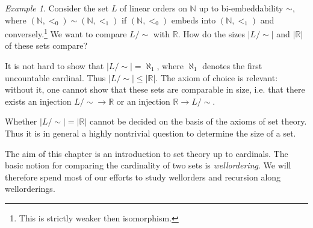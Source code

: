 \documentclass[a4paper, 11pt]{amsart}
\theoremstyle{remark}
\newtheorem{example}[example]{Example}
\newcommand{\NN}{\mathbb{N}}
\newcommand{\RR}{\mathbb{R}}
\begin{document}

\begin{example} 
Consider the set $L$ of linear orders on $\NN$ up to bi-embeddability $\sim$, where $(\NN,<_0)\sim (\NN,<_1)$ if $(\NN,<_0)$ embeds into $(\NN,<_1)$ and conversely.\footnote{This is strictly weaker then isomorphism.} 
We want to compare $L{/}{\sim}$ with $\RR$. 
How do the sizes $|L{/}{\sim}|$ and $|\RR|$ of these sets compare? 

It is not hard to show that $|L{/}{\sim}|=\aleph_1$, where $\aleph_1$ denotes the first uncountable cardinal. 
Thus $|L{/}{\sim}|\leq |\RR|$. 
The axiom of choice is relevant: without it, one cannot show that these sets are comparable in size, i.e. that there exists an injection $L{/}{\sim} \rightarrow \RR$ or an injection $\RR \rightarrow L{/}{\sim}$. 

Whether $|L{/}{\sim}|= |\RR|$ cannot be decided on the basis of the axioms of set theory. 
Thus it is in general a highly nontrivial question to determine the size of a set. 
\end{example} 


The aim of this chapter is an introduction to set theory up to cardinals. 
The basic notion for comparing the cardinality of two sets is \emph{wellordering}. 
We will therefore spend most of our efforts to study wellorders and recursion along wellorderings. 
\end{document}

